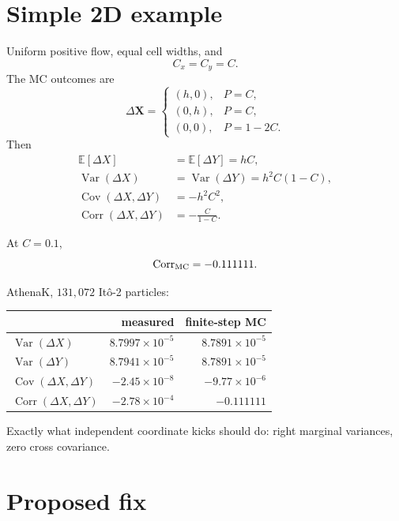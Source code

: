 \documentclass[11pt]{article}
\newcommand{\ddX}{\Delta\mathbf{X}}
\newcommand{\mean}[1]{\mathbb{E}\!\left[#1\right]}
\newcommand{\cov}{\operatorname{Cov}}
\begin{document}
\section*{Simple 2D example}

Uniform positive flow, equal cell widths, and
\begin{equation}
  C_x=C_y=C.
\end{equation}
The MC outcomes are
\begin{equation}
  \ddX=
  \begin{cases}
    (h,0), & P=C,\\
    (0,h), & P=C,\\
    (0,0), & P=1-2C.
  \end{cases}
\end{equation}
Then
\begin{align}
  \mean{\Delta X}
  &=
  \mean{\Delta Y}
  =hC,\\
  \operatorname{Var}(\Delta X)
  &=
  \operatorname{Var}(\Delta Y)
  =h^2C(1-C),\\
  \cov(\Delta X,\Delta Y)
  &=-h^2C^2,\\
  \operatorname{Corr}(\Delta X,\Delta Y)
  &=-\frac{C}{1-C}.
\end{align}

At \(C=0.1\),
\begin{equation}
  \operatorname{Corr}_{\rm MC}=-0.111111.
\end{equation}

AthenaK, \(131{,}072\) It\^o-2 particles:
\begin{center}
\begin{tabular}{@{}lrr@{}}
\toprule
 & measured & finite-step MC \\
\midrule
\(\operatorname{Var}(\Delta X)\)
  & \(8.7997\times10^{-5}\) & \(8.7891\times10^{-5}\)\\
\(\operatorname{Var}(\Delta Y)\)
  & \(8.7941\times10^{-5}\) & \(8.7891\times10^{-5}\)\\
\(\cov(\Delta X,\Delta Y)\)
  & \(-2.45\times10^{-8}\) & \(-9.77\times10^{-6}\)\\
\(\operatorname{Corr}(\Delta X,\Delta Y)\)
  & \(-2.78\times10^{-4}\) & \(-0.111111\)\\
\bottomrule
\end{tabular}
\end{center}

Exactly what independent coordinate kicks should do: right marginal
variances, zero cross covariance.

\section*{Proposed fix}
\end{document}
